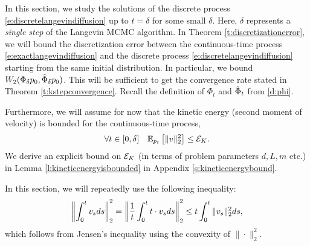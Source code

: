 \label{s:discreteerror}
In this section, we study the solutions of the discrete process \eqref{e:discretelangevindiffusion} up to $t=\delta$ for some small $\delta$. Here, $\delta$ represents a \emph{single step} of the Langevin MCMC algorithm. In Theorem \ref{t:discretizationerror}, we will bound the discretization error between the continuous-time process \eqref{e:exactlangevindiffusion} and the discrete process \eqref{e:discretelangevindiffusion} starting from the same initial distribution.
In particular, we bound $W_2 (\Phi_\delta p_0,\tilde{\Phi}_\delta p_0 )$. This will be sufficient to get the convergence rate stated in Theorem \ref{t:kstepconvergence}. Recall the definition of $\Phi_t$ and $\tilde{\Phi}_t$ from \eqref{d:phi}.

Furthermore, we will assume for now that the kinetic energy (second moment of velocity) is bounded for the continuous-time process,
\begin{equation}
\label{e:energyisbounded}
\forall t\in [0,\delta]\quad \mathbb{E}_{p_t}\left[\|v\|_2^2\right]\leq \mathcal{E}_K.
\end{equation}
We derive an explicit bound on $\mathcal{E}_K$ (in terms of problem parameters $d,L,m$ etc.) in Lemma \ref{l:kineticenergyisbounded} in Appendix \ref{s:kineticenergybound}. 

In this section, we will repeatedly use the following inequality:
$$\left\| \int_0^t v_s ds\right\|_2^2  =  \left\| \frac{1}{t}\int_0^t t \cdot v_s ds\right\|_2^2 \leq t\int_0^t \|v_s\|_2^2 ds,$$
which follows from Jensen's inequality using the convexity of $\|\cdot\|_2^2$.  

